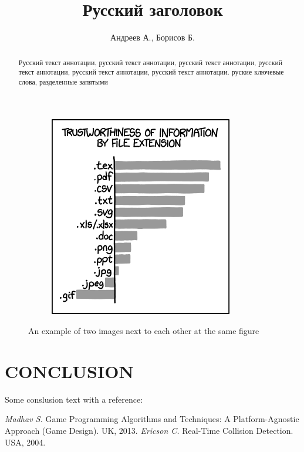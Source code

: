 \documentclass[intlimits,twoside,a4paper,11pt]{article}
\begin{document}
\begin{figure}[H]
\begin{subfigure}[t]{50mm}
		\includegraphics[width=\textwidth]{xkcd1301.png}
		\subcaption{} %
		\label{fig-example-2b}
	\end{subfigure}
	\caption{An example of two images next to each other at the same figure} \label{fig-example-2}
\end{figure}

\section{CONCLUSION}
Some conslusion text with a reference:~\cite{lib-1,lib-2}

\begin{thebibliography}{9}
 {\it Madhav S.} Game Programming Algorithms and Techniques: A Platform-Agnostic Approach (Game Design). UK, 2013. 
 {\it Ericson C.} Real-Time Collision Detection. USA, 2004.
\end{thebibliography}

\translatedpart

\title{Русский заголовок}
\author{Андреев А., Борисов Б.}

\maketranslatedtitle

\begin{abstract}
Русский текст аннотации, русский текст аннотации, русский текст аннотации, русский текст аннотации, русский текст аннотации, русский текст аннотации.
\keywords руские ключевые слова, разделенные запятыми
\end{abstract}

\makekioauthors
\end{document}
